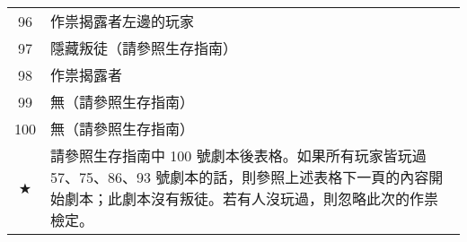 \begin{center}
\begin{minipage}[t]{.45\textwidth}
\begin{tabular}[t]{ c l }
        96 & 作祟揭露者左邊的玩家 \\
        97 & 隱藏叛徒（請參照生存指南） \\
        98 & 作祟揭露者 \\
        99 & 無（請參照生存指南）\\
        100& 無（請參照生存指南）\\

        ★  & \begin{minipage}[t]{15em}請參照生存指南中 100 號劇本後表格。如果所有玩家皆玩過 57、75、86、93 號劇本的話，則參照上述表格下一頁的內容開始劇本；此劇本沒有叛徒。若有人沒玩過，則忽略此次的作祟檢定。\end{minipage} \\
    \end{tabular}
  \end{minipage}
\end{center}

\twocolumn

